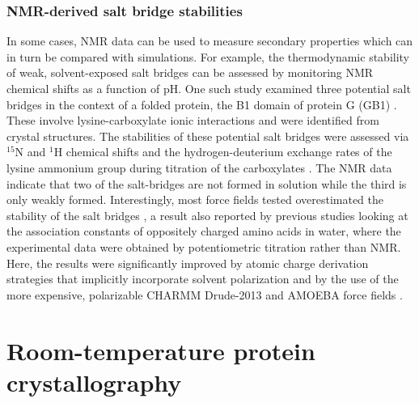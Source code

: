\documentclass[9pt,review]{livecoms}
\begin{document}
\subsubsection{NMR-derived salt bridge stabilities}
\label{sub2:salt_bridge}

In some cases, NMR data can be used to measure secondary properties which can in turn be compared with simulations.
For example, the thermodynamic stability of weak, solvent-exposed salt bridges can be assessed by monitoring NMR chemical shifts as a function of pH.
One such study examined three potential salt bridges in the context of a folded protein, the B1 domain of protein G (GB1) \cite{ahmed_how_2018}.
These involve lysine-carboxylate ionic interactions and were identified from crystal structures.
The stabilities of these potential salt bridges were assessed via $^{15}$N and $^1$H chemical shifts and the hydrogen-deuterium exchange rates of the lysine ammonium group during titration of the carboxylates \cite{tomlinson2009characterization}.
The NMR data indicate that two of the salt-bridges are not formed in solution while the third is only weakly formed.
Interestingly, most force fields tested overestimated the stability of the salt bridges \cite{ahmed_how_2018}, a result also reported by previous studies \cite{piana_how_2011,debiec_evaluating_2014} looking at the association constants of oppositely charged amino acids in water, where the experimental data were obtained by potentiometric titration rather than NMR.
Here, the results were significantly improved by atomic charge derivation strategies that implicitly incorporate solvent polarization \cite{debiec_further_2016} and by the use of the more expensive, polarizable CHARMM Drude-2013 \cite{lopes_polarizable_2013} and AMOEBA force fields \cite{shi_polarizable_2013}.

\section{Room-temperature protein crystallography}
\label{sec:xtal}
\end{document}
